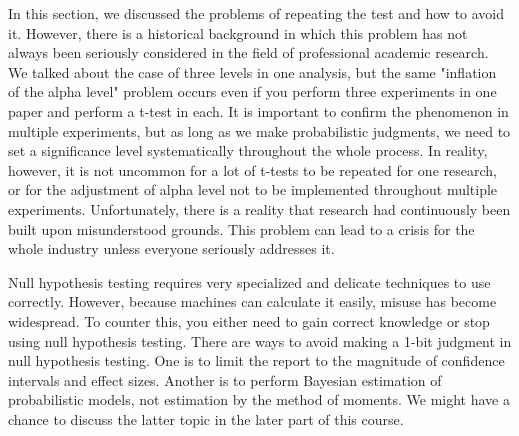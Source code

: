 \documentclass{ltjsarticle}
\begin{document}
In this section, we discussed the problems of repeating the test and how to avoid it. However, there is a historical background in which this problem has not always been seriously considered in the field of professional academic research. We talked about the case of three levels in one analysis, but the same "inflation of the alpha level" problem occurs even if you perform three experiments in one paper and perform a t-test in each. It is important to confirm the phenomenon in multiple experiments, but as long as we make probabilistic judgments, we need to set a significance level systematically throughout the whole process. In reality, however, it is not uncommon for a lot of t-tests to be repeated for one research, or for the adjustment of alpha level not to be implemented throughout multiple experiments. Unfortunately, there is a reality that research had continuously been built upon misunderstood grounds. This problem can lead to a crisis for the whole industry unless everyone seriously addresses it.

Null hypothesis testing requires very specialized and delicate techniques to use correctly. However, because machines can calculate it easily, misuse has become widespread. To counter this, you either need to gain correct knowledge or stop using null hypothesis testing. There are ways to avoid making a 1-bit judgment in null hypothesis testing. One is to limit the report to the magnitude of confidence intervals and effect sizes. Another is to perform Bayesian estimation of probabilistic models, not estimation by the method of moments. We might have a chance to discuss the latter topic in the later part of this course.
\end{document}
